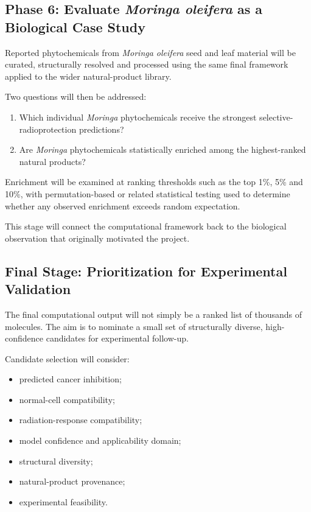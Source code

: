 \documentclass[11pt,a4paper]{article}
\begin{document}
\subsection{Phase 6: Evaluate \textit{Moringa oleifera} as a Biological Case Study}

Reported phytochemicals from \textit{Moringa oleifera} seed and leaf material will be curated, structurally resolved and processed using the same final framework applied to the wider natural-product library.

Two questions will then be addressed:

\begin{enumerate}[leftmargin=1.6em]
    \item Which individual \textit{Moringa} phytochemicals receive the strongest selective-radioprotection predictions?
    \item Are \textit{Moringa} phytochemicals statistically enriched among the highest-ranked natural products?
\end{enumerate}

Enrichment will be examined at ranking thresholds such as the top 1\%, 5\% and 10\%, with permutation-based or related statistical testing used to determine whether any observed enrichment exceeds random expectation.

This stage will connect the computational framework back to the biological observation that originally motivated the project.

\subsection{Final Stage: Prioritization for Experimental Validation}

The final computational output will not simply be a ranked list of thousands of molecules. The aim is to nominate a small set of structurally diverse, high-confidence candidates for experimental follow-up.

Candidate selection will consider:

\begin{itemize}[leftmargin=1.6em]
    \item predicted cancer inhibition;
    \item normal-cell compatibility;
    \item radiation-response compatibility;
    \item model confidence and applicability domain;
    \item structural diversity;
    \item natural-product provenance;
    \item experimental feasibility.
\end{itemize}
\end{document}
